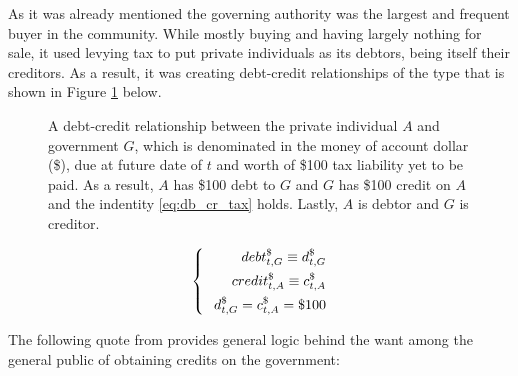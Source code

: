 As it was already mentioned the governing authority was the largest and frequent buyer in the community. While mostly buying and having largely nothing for sale, it used levying tax to put private individuals as its debtors, being itself their creditors. As a result, it was creating debt-credit relationships of the type that is shown in Figure \ref{fig:debt_credit_rel2} below.

\begin{figure}[!ht]
\centering
\vspace{.4in}
\captionsetup{width=.9\linewidth,labelfont=bf}
\usetikzlibrary {matrix}
\caption[A debt-credit relationship between tax-paying individual and government]%
{A debt-credit relationship between the private individual $A$ and government $G$, which is denominated in the money of account dollar (\$), due at future date of $t$ and worth of \$100 tax liability yet to be paid. As a result, $A$ has \$100 debt to $G$ and $G$ has \$100 credit on $A$ and the indentity \ref{eq:db_cr_tax} holds. Lastly, $A$ is debtor and $G$ is creditor.}
\label{fig:debt_credit_rel2}
\end{figure}

\begin{equation}\label{eq:db_cr_tax}
\left\{
\begin{alignedat}{1}
debt^{\$}_{t,G} \equiv d^{\$}_{t,G} \\
credit^{\$}_{t,A} \equiv c^{\$}_{t,A} \\
\hspace{.1in} d^{\$}_{t,G}=c^{\$}_{t,A}=\$100 \\
\end{alignedat}
\right.
\vspace{.2in}
\end{equation}

The following quote from \citep{innes1913} provides general logic behind the want among the general public of obtaining credits on the government: 

